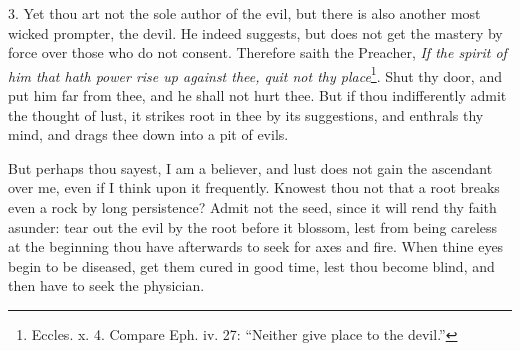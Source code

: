 3. Yet thou art not the sole author of the evil, but there is also another most wicked prompter, the devil. He indeed suggests, but does not get the mastery by force over those who do not consent. Therefore saith the Preacher, \emph{If the spirit of him that hath power rise up against thee, quit not thy place}\footnote{Eccles. x. 4. Compare Eph. iv. 27: “Neither give place to the devil.”}. Shut thy door, and put him far from thee, and he shall not hurt thee. But if thou indifferently admit the thought of lust, it strikes root in thee by its suggestions, and enthrals thy mind, and drags thee down into a pit of evils.

But perhaps thou sayest, I am a believer, and lust does not gain the ascendant over me, even if I think upon it frequently. Knowest thou not that a root breaks even a rock by long persistence? Admit not the seed, since it will rend thy faith asunder: tear out the evil by the root before it blossom, lest from being careless at the beginning thou have afterwards to seek for axes and fire. When thine eyes begin to be diseased, get them cured in good time, lest thou become blind, and then have to seek the physician.

